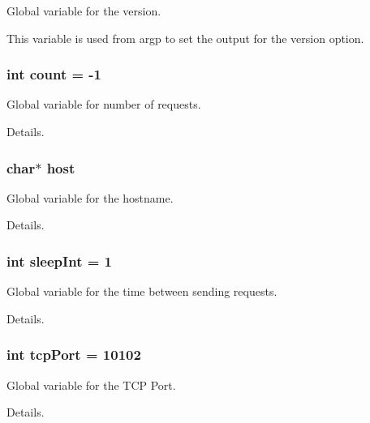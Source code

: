 Global variable for the version. 

This variable is used from argp to set the output for the version option. 
\subsubsection[{\texorpdfstring{count}{count}}]{\setlength{\rightskip}{0pt plus 5cm}int count = -\/1}\hypertarget{simple-iec61850-client_8c_ad43c3812e6d13e0518d9f8b8f463ffcf}{}\label{simple-iec61850-client_8c_ad43c3812e6d13e0518d9f8b8f463ffcf}


Global variable for number of requests. 

Details. 
\subsubsection[{\texorpdfstring{host}{host}}]{\setlength{\rightskip}{0pt plus 5cm}char$\ast$ host}\hypertarget{simple-iec61850-client_8c_a1c2046dcb30a629d6d9f45ff8f403f12}{}\label{simple-iec61850-client_8c_a1c2046dcb30a629d6d9f45ff8f403f12}


Global variable for the hostname. 

Details. 
\subsubsection[{\texorpdfstring{sleep\+Int}{sleepInt}}]{\setlength{\rightskip}{0pt plus 5cm}int sleep\+Int = 1}\hypertarget{simple-iec61850-client_8c_a7c0b25939579bd308b11966fb04288e0}{}\label{simple-iec61850-client_8c_a7c0b25939579bd308b11966fb04288e0}


Global variable for the time between sending requests. 

Details. 
\subsubsection[{\texorpdfstring{tcp\+Port}{tcpPort}}]{\setlength{\rightskip}{0pt plus 5cm}int tcp\+Port = 10102}\hypertarget{simple-iec61850-client_8c_ac31354d08316076b496efb2b3a2c69e6}{}\label{simple-iec61850-client_8c_ac31354d08316076b496efb2b3a2c69e6}


Global variable for the T\+CP Port. 

Details. 